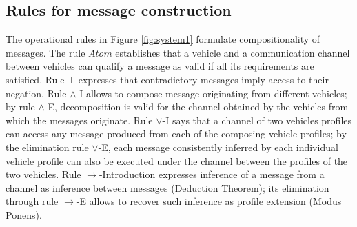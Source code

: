 \documentclass[compsoc, conference, letterpaper, 10pt, times]{IEEEtran}
\begin{document}
\subsection{Rules for message construction}

The operational rules in Figure \ref{fig:system1} formulate compositionality of messages. The rule $Atom$ establishes that a vehicle and a communication channel between vehicles can qualify a message as valid if all its requirements are satisfied. Rule $\bot$ expresses that contradictory messages imply access to their negation. Rule $\wedge$-I allows to compose message originating from different vehicles; by rule $\wedge$-E, decomposition is valid for the channel obtained by the vehicles from which the messages originate. Rule $\vee$-I says that a channel of two vehicles profiles can access any message produced from each of the composing vehicle profiles; by the elimination rule $\vee$-E, each message consistently inferred by each individual vehicle profile can also be executed under the channel between the profiles of the two vehicles. Rule $\rightarrow$-Introduction expresses inference of a message from a channel as inference between messages (Deduction Theorem); its elimination through rule $\rightarrow$-E allows to recover such inference as profile extension (Modus Ponens).
\end{document}
